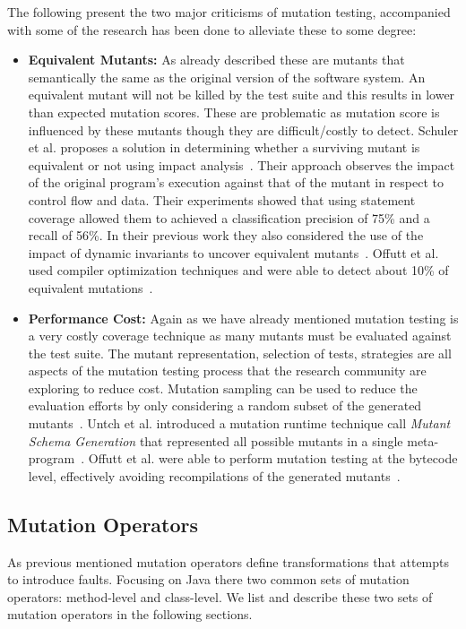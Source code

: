 The following present the two major criticisms of mutation testing, accompanied with some of the research has been done to alleviate these to some degree:

\begin{itemize}
	\item \textbf{Equivalent Mutants:} As already described these are mutants that semantically the same as the original version of the software system. An equivalent mutant will not be killed by the test suite and this results in lower than expected mutation scores. These are problematic as mutation score is influenced by these mutants though they are difficult/costly to detect. Schuler et al. proposes a solution in determining whether a surviving mutant is equivalent or not using impact analysis~\cite{SZ10}. Their approach observes the impact of the original program's execution against that of the mutant in respect to control flow and data. Their experiments showed that using statement coverage allowed them to achieved a classification precision of 75\% and a recall of 56\%. In their previous work they also considered the use of the impact of dynamic invariants to uncover equivalent mutants~\cite{SDZ09}. Offutt et al. used compiler optimization techniques and were able to detect about 10\% of equivalent mutations~\cite{OC94}.
	\item \textbf{Performance Cost:} Again as we have already mentioned mutation testing is a very costly coverage technique as many mutants must be evaluated against the test suite. The mutant representation, selection of tests, strategies are all aspects of the mutation testing process that the research community are exploring to reduce cost. Mutation sampling can be used to reduce the evaluation efforts by only considering a random subset of the generated mutants~\cite{Bud80}. Untch et al. introduced a mutation runtime technique call \emph{Mutant Schema Generation} that represented all possible mutants in a single meta-program~\cite{UOH93}. Offutt et al. were able to perform mutation testing at the bytecode level, effectively avoiding recompilations of the generated mutants~\cite{OMK04}.
\end{itemize}

\subsection{Mutation Operators}
\label{subsec:background_mutation_operators}
As previous mentioned mutation operators define transformations that attempts to introduce faults. Focusing on Java there two common sets of mutation operators: method-level and class-level. We list and describe these two sets of mutation operators in the following sections.


